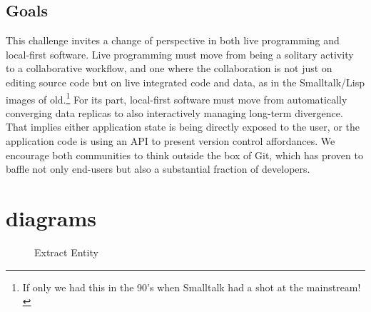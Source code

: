 \documentclass[english,submission]{programming}
\begin{document}
\subsection{Goals}
This challenge invites a change of perspective in both live programming and local-first software. Live programming must move from being a solitary activity to a collaborative workflow, and one where the collaboration is not just on editing source code but on live integrated code and data, as in the Smalltalk/Lisp images of old.\footnote{If only we had this in the 90's when Smalltalk had a shot at the mainstream!} For its part, local-first software must move from automatically converging data replicas to also interactively managing long-term divergence. That implies either application state is being directly exposed to the user, or the application code is using an API to present version control affordances. We encourage both communities to think outside the box of Git, which has proven to baffle not only end-users but also a substantial fraction of developers.



\section{diagrams}

\begin{figure}[H]
  \centering
  \caption{Extract Entity}
\end{figure}
\end{document}
